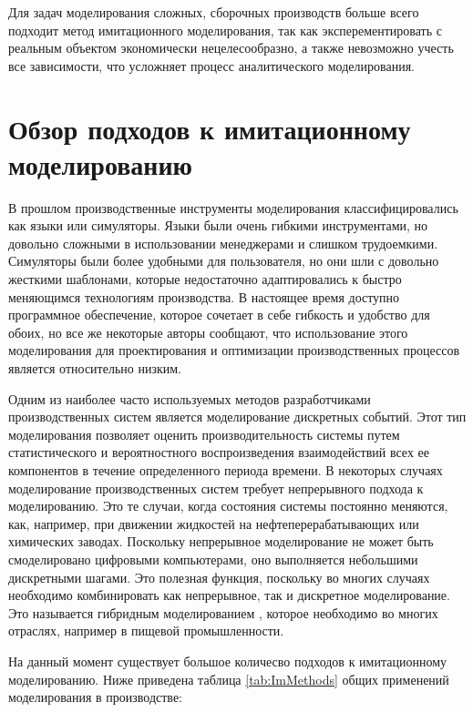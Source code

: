 Для задач моделирования сложных, сборочных производств больше всего подходит метод имитационного моделирования, так как эксперементировать с реальным объектом экономически нецелесообразно, а также невозможно учесть все зависимости, что усложняет процесс аналитического моделирования.

\section{Обзор подходов к имитационному моделированию}

В прошлом производственные инструменты моделирования классифицировались как языки или симуляторы. \cite{Velazco} Языки были очень гибкими инструментами, но довольно сложными в использовании менеджерами и слишком трудоемкими. Симуляторы были более удобными для пользователя, но они шли с довольно жесткими шаблонами, которые недостаточно адаптировались к быстро меняющимся технологиям производства. В настоящее время доступно программное обеспечение, которое сочетает в себе гибкость и удобство для обоих, но все же некоторые авторы сообщают, что использование этого моделирования для проектирования и оптимизации производственных процессов является относительно низким. \cite{Benedettini} \cite{Holst}

Одним из наиболее часто используемых методов разработчиками производственных систем является моделирование дискретных событий. \cite{Detty} Этот тип моделирования позволяет оценить производительность системы путем статистического и вероятностного воспроизведения взаимодействий всех ее компонентов в течение определенного периода времени. В некоторых случаях моделирование производственных систем требует непрерывного подхода к моделированию. \cite{Robinson} Это те случаи, когда состояния системы постоянно меняются, как, например, при движении жидкостей на нефтеперерабатывающих или химических заводах. Поскольку непрерывное моделирование не может быть смоделировано цифровыми компьютерами, оно выполняется небольшими дискретными шагами. Это полезная функция, поскольку во многих случаях необходимо комбинировать как непрерывное, так и дискретное моделирование. Это называется гибридным моделированием \cite{inproceedings}, которое необходимо во многих отраслях, например в пищевой промышленности. \cite{Benedettini}

На данный момент существует большое количесво подходов к имитационному моделированию. Ниже приведена таблица \ref{tab:ImMethods} общих применений моделирования в производстве\cite{Jahangirian}:

